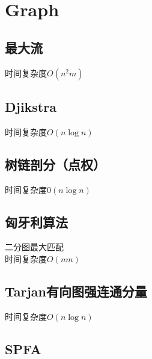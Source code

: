 \section{Graph}

\subsection{最大流}
时间复杂度$O(n^2m)$\\


\subsection{Djikstra}
时间复杂度$O(n\log n)$ \\


\subsection{树链剖分（点权）}
时间复杂度$0(n\log n)$\\


\subsection{匈牙利算法}
二分图最大匹配\\
时间复杂度$O(nm)$\\


\subsection{Tarjan有向图强连通分量}
时间复杂度$O(n\log n)$ \\


\subsection{SPFA}
